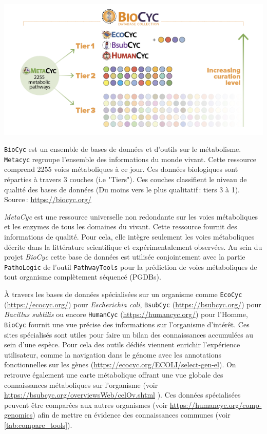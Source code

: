 \begin{refsegment}
    
    \begin{shadedfigure}[H]
    	\centering
    	\includegraphics[width=\textwidth]{img/BioCycCollection.png}
    	\caption{\texttt{BioCyc} est un ensemble de bases de données et d'outils sur le métabolisme. \texttt{Metacyc} regroupe l'ensemble des informations du monde vivant. Cette ressource comprend 2255 voies métaboliques à ce jour. Ces données biologiques sont réparties à travers 3 couches (i.e "Tiers"). Ces couches classifient le niveau de qualité des bases de données  (Du moins vers le plus qualitatif : tiers 3 à 1). \hspace{\textwidth} Source : \url{https://biocyc.org/}    }
    	\label{fig:biocyc_collection}
    \end{shadedfigure}
    
    \textit{MetaCyc} \cite{Karp2011,caspi2013metacyc,caspi2016metacyc} est une ressource universelle non redondante sur les voies métaboliques et les enzymes de tous les domaines du vivant. Cette ressource fournit des informations de qualité. Pour cela, elle intègre seulement les voies métaboliques décrite dans la littérature scientifique et expérimentalement observées. Au sein du projet \textit{BioCyc} cette base de données est utilisée conjointement avec la partie \texttt{PathoLogic} de l'outil \texttt{PathwayTools} pour la prédiction de voies métaboliques de tout organisme complètement séquencé (PGDBs).  
    
    À travers les bases de données spécialisées sur un organisme comme \texttt{EcoCyc} (\url{https://ecocyc.org/}) pour \textit{Escherichia coli}, \texttt{BsubCyc} (\url{https://bsubcyc.org/}) pour \textit{Bacillus subtilis} ou encore \texttt{HumanCyc} (\url{https://humancyc.org/}) pour l'Homme, \texttt{BioCyc} fournit une vue précise des informations sur l'organisme d'intérêt. Ces sites spécialisés sont utiles pour faire un bilan des connaissances accumulées au sein d'une espèce. Pour cela des outils dédiés viennent enrichir l'expérience utilisateur, comme la navigation dans le génome avec les annotations fonctionnelles sur les gènes (\url{https://ecocyc.org/ECOLI/select-gen-el}). On retrouve également une carte métabolique offrant une vue globale des connaissances métaboliques sur l'organisme (voir \url{https://bsubcyc.org/overviewsWeb/celOv.shtml} ). Ces données spécialisées peuvent être comparées aux autres organismes  (voir \url{https://humancyc.org/comp-genomics}) afin de mettre en évidence des connaissances communes (voir \cref{tab:compare_tools}).
    

\end{refsegment}
